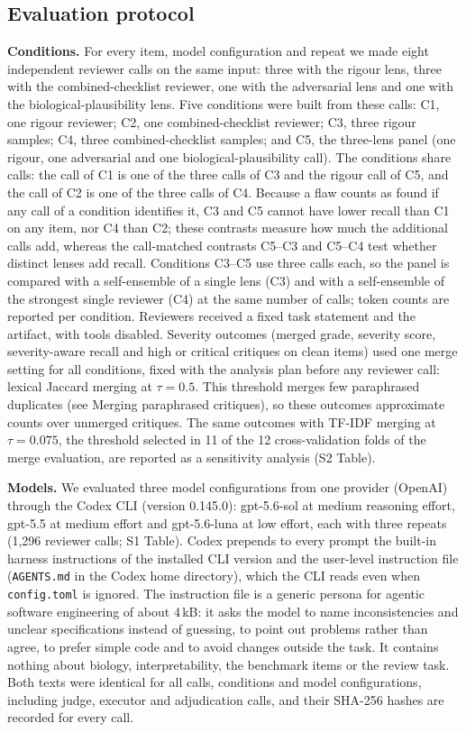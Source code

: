 \subsection*{Evaluation protocol}

\textbf{Conditions.} For every item, model configuration and repeat we made eight independent reviewer calls on the same input: three with the rigour lens, three with the combined-checklist reviewer, one with the adversarial lens and one with the biological-plausibility lens. Five conditions were built from these calls: C1, one rigour reviewer; C2, one combined-checklist reviewer; C3, three rigour samples; C4, three combined-checklist samples; and C5, the three-lens panel (one rigour, one adversarial and one biological-plausibility call). The conditions share calls: the call of C1 is one of the three calls of C3 and the rigour call of C5, and the call of C2 is one of the three calls of C4. Because a flaw counts as found if any call of a condition identifies it, C3 and C5 cannot have lower recall than C1 on any item, nor C4 than C2; these contrasts measure how much the additional calls add, whereas the call-matched contrasts C5--C3 and C5--C4 test whether distinct lenses add recall. Conditions C3--C5 use three calls each, so the panel is compared with a self-ensemble of a single lens (C3) and with a self-ensemble of the strongest single reviewer (C4) at the same number of calls; token counts are reported per condition. Reviewers received a fixed task statement and the artifact, with tools disabled. Severity outcomes (merged grade, severity score, severity-aware recall and high or critical critiques on clean items) used one merge setting for all conditions, fixed with the analysis plan before any reviewer call: lexical Jaccard merging at $\tau=0.5$. This threshold merges few paraphrased duplicates (see Merging paraphrased critiques), so these outcomes approximate counts over unmerged critiques. The same outcomes with TF-IDF merging at $\tau=0.075$, the threshold selected in 11 of the 12 cross-validation folds of the merge evaluation, are reported as a sensitivity analysis (S2 Table).

\textbf{Models.} We evaluated three model configurations from one provider (OpenAI) through the Codex CLI (version 0.145.0): gpt-5.6-sol at medium reasoning effort, gpt-5.5 at medium effort and gpt-5.6-luna at low effort, each with three repeats (1,296 reviewer calls; S1 Table). Codex prepends to every prompt the built-in harness instructions of the installed CLI version and the user-level instruction file (\texttt{AGENTS.md} in the Codex home directory), which the CLI reads even when \texttt{config.toml} is ignored. The instruction file is a generic persona for agentic software engineering of about 4\,kB: it asks the model to name inconsistencies and unclear specifications instead of guessing, to point out problems rather than agree, to prefer simple code and to avoid changes outside the task. It contains nothing about biology, interpretability, the benchmark items or the review task. Both texts were identical for all calls, conditions and model configurations, including judge, executor and adjudication calls, and their SHA-256 hashes are recorded for every call.

